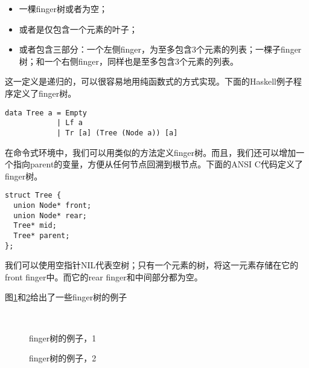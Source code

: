 \documentclass[UTF8]{article}
\begin{document}
\begin{itemize}
\item 一棵finger树或者为空；
\item 或者是仅包含一个元素的叶子；
\item 或者包含三部分：一个左侧finger，为至多包含3个元素的列表；一棵子finger树；和一个右侧finger，同样也是至多包含3个元素的列表。
\end{itemize}

这一定义是递归的，可以很容易地用纯函数式的方式实现。下面的Haskell例子程序定义了finger树。

\lstset{language=Haskell}
\begin{lstlisting}
data Tree a = Empty
            | Lf a
            | Tr [a] (Tree (Node a)) [a]
\end{lstlisting}

在命令式环境中，我们可以用类似的方法定义finger树。而且，我们还可以增加一个指向parent的变量，方便从任何节点回溯到根节点。下面的ANSI C代码定义了finger树。

\lstset{language=C}
\begin{lstlisting}
struct Tree {
  union Node* front;
  union Node* rear;
  Tree* mid;
  Tree* parent;
};
\end{lstlisting}

我们可以使用空指针NIL代表空树；只有一个元素的树，将这一元素存储在它的front finger中。而它的rear finger和中间部分都为空。

图\ref{fig:ftr-example-1}和\ref{fig:ftr-example-2}给出了一些finger树的例子

\begin{figure}[htbp]
  \centering
   \\
  \caption{finger树的例子，1} \label{fig:ftr-example-1}
\end{figure}

\begin{figure}[htbp]
  \centering
  \hspace{0.2\textwidth}
  \caption{finger树的例子，2} \label{fig:ftr-example-2}
\end{figure}
\end{document}
